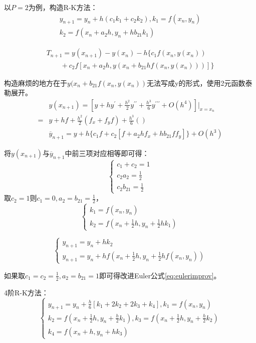 \documentclass{article}
\begin{document}
以$P=2$为例，构造R-K方法：
$$
\begin{array}{lr}
    y_{n+1} = y_n + h(c_1k_1+c_2k_2), k_1=f(x_n, y_n)\\
    k_2 = f(x_n+a_2h, y_n+hb_{21}k_1)
\end{array}
$$

\begin{equation*}
    \begin{array}{lr}
        T_{n+1}=y(x_{n+1})-y(x_n)-h\{c_1f(x_n, y(x_n)) \\
        \quad \quad +c_2f[x_n+a_2h, y(x_n+b_{21}hf(x_n, y(x_n)))]\}
    \end{array}
\end{equation*}

构造麻烦的地方在于$y(x_n+b_{21}f(x_n, y(x_n))$无法写成y的形式，使用2元函数泰勒展开。
\begin{equation*}
    \begin{split}
        &y(x_{n+1})=[y+hy^{'}+\frac{h^2}{2}y^{{'}{'}}+\frac{h^3}{6}y^{{'}{'}{'}}+O(h^4)]|_{x=x_n}\\
        =&y+hf+\frac{h^2}{2}(f_x+f_yf)+\frac{h^3}{6}() \\
        &\overline{y}_{n+1} = y + h\{c_1f + c_2[f+a_2hf_x+hb_{21}ff_y]\} + O(h^3)
    \end{split}
\end{equation*}

将$y(x_{n+1})$与$\overline{y}_{n+1}$中前三项对应相等即可得：
$$
\left\{
\begin{array}{lr}
    c_1+c_2 = 1 \\
    c_2a_2 = \frac{1}{2} \\
    c_2b_{21} = \frac{1}{2}
\end{array}\right.
$$
取$c_2=1$则$c_1=0,a_2=b_{21}=\frac{1}{2}$，
$$
\left\{
\begin{array}{lr}
    k_1 = f(x_n, y_n) \\
    k_2 = f(x_n+\frac{1}{2}h, y_n+\frac{1}{2}hk_1)
\end{array}\right.
$$

\begin{equation}
    \left\{
        \begin{array}{lr}
            y_{n+1} = y_n+hk_2 \\
            y_{n+1} = y_n+hf(x_n+\frac{1}{2}h, y_n+\frac{1}{2}hf(x_n, y_n))
        \end{array}
        \right.
\end{equation}

如果取$c_1=c_2=\frac{1}{2}, a_2=b_{21}=1$即可得改进Euler公式\ref{eq:eulerimprov}。

4阶R-K方法：
\begin{equation}
    \left\{
    \begin{array}{lr}
        y_{n+1} = y_n +\frac{h}{6}[k_1+2k_2+2k_3+k_4], k_1=f(x_n, y_n) \\
        k_2 = f(x_n+\frac{1}{2}h, y_n+\frac{h}{2}k_1), k_3=f(x_n+\frac{1}{2}h, y_n+\frac{h}{2}k_2) \\
        k_4 = f(x_n+h, y_n+hk_3)
    \end{array}\right.
\end{equation}
\end{document}
